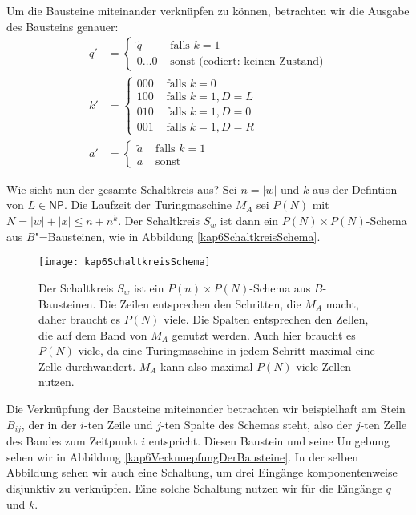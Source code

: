 \begin{Bew}
  Um die Bausteine miteinander verknüpfen zu können, betrachten wir die Ausgabe des Bausteins genauer:
  \begin{align*}
    q' &= \begin{cases} \tilde{q} & \text{ falls } k=1 \\ 0 \ldots 0 & \text{ sonst (codiert: keinen Zustand)} \end{cases} \\
    k' &= \begin{cases}000 & \text{ falls } k=0 \\ 100 & \text{ falls } k=1, D=L \\ 010 & \text{ falls } k=1, D=0 \\ 001 & \text{ falls } k=1, D=R \end{cases} \\
    a' &= \begin{cases} \tilde{a} & \text{ falls } k=1 \\ a & \text{ sonst}\end{cases}
  \end{align*}
  
  Wie sieht nun der gesamte Schaltkreis aus? Sei $n=|w|$ und $k$ aus der Defintion von $L \in \mathsf{NP}$. Die Laufzeit der Turingmaschine $M_A$ sei $P(N)$ mit $N = |w| + |x| \le n + n^k$. Der Schaltkreis $S_w$ ist dann ein $P(N) \times P(N)$-Schema aus $B$"=Bausteinen, wie in Abbildung \vref{kap6SchaltkreisSchema}.
  
  \begin{figure}[htb]
    \centering
    \texttt{[image: kap6SchaltkreisSchema]}
    \caption{Der Schaltkreis $S_w$ ist ein $P(n) \times P(N)$-Schema aus $B$-Bausteinen. Die Zeilen entsprechen den Schritten, die $M_A$ macht, daher braucht es $P(N)$ viele. Die Spalten entsprechen den Zellen, die auf dem Band von $M_A$ genutzt werden. Auch hier braucht es $P(N)$ viele, da eine Turingmaschine in jedem Schritt maximal eine Zelle durchwandert. $M_A$ kann also maximal $P(N)$ viele Zellen nutzen.}
    \label{kap6SchaltkreisSchema}
  \end{figure}
  
  Die Verknüpfung der Bausteine miteinander betrachten wir beispielhaft am Stein $B_{ij}$, der in der $i$-ten Zeile und $j$-ten Spalte des Schemas steht, also der $j$-ten Zelle des Bandes zum Zeitpunkt $i$ entspricht. Diesen Baustein und seine Umgebung sehen wir in Abbildung \vref{kap6VerknuepfungDerBausteine}. In der selben Abbildung sehen wir auch eine Schaltung, um drei Eingänge komponentenweise disjunktiv zu verknüpfen. Eine solche Schaltung nutzen wir für die Eingänge $q$ und $k$.
  

\end{Bew}
